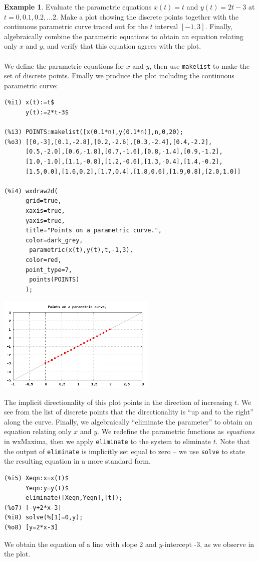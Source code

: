 \documentclass[10.5pt,twoside]{report}
\theoremstyle{definition}
\newtheorem{exmp}{Example}[section]
\begin{document}
\begin{exmp}  Evaluate the parametric equations $x(t)=t$ and $y(t)=2t-3$ at $t=0,0.1,0.2,\dots 2$.  Make a plot showing the discrete points together with the continuous parametric curve traced out for the $t$ interval $[-1,3]$.  Finally, algebraically combine the parametric equations to obtain an equation relating only $x$ and $y$, and verify that this equation agrees with the plot. \\
${}$\\

We define the parametric equations for $x$ and $y$, then use \verb|makelist| to make the set of discrete points.  Finally we produce the plot including the continuous parametric curve:

\begin{verbatim}
(%i1) x(t):=t$
      y(t):=2*t-3$
      
(%i3) POINTS:makelist([x(0.1*n),y(0.1*n)],n,0,20);
(%o3) [[0,-3],[0.1,-2.8],[0.2,-2.6],[0.3,-2.4],[0.4,-2.2],
      [0.5,-2.0],[0.6,-1.8],[0.7,-1.6],[0.8,-1.4],[0.9,-1.2],
      [1.0,-1.0],[1.1,-0.8],[1.2,-0.6],[1.3,-0.4],[1.4,-0.2],
      [1.5,0.0],[1.6,0.2],[1.7,0.4],[1.8,0.6],[1.9,0.8],[2.0,1.0]]
      
(%i4) wxdraw2d(
      grid=true,
      xaxis=true,
      yaxis=true,
      title="Points on a parametric curve.",
      color=dark_grey,
       parametric(x(t),y(t),t,-1,3),
      color=red,
      point_type=7,
       points(POINTS)
      );
\end{verbatim}

\includegraphics[width=3in]{example_5_1_1_1}

The implicit directionality of this plot points in the direction of increasing $t$.  We see from the list of discrete points that the directionality is ``up and to the right'' along the curve.  Finally, we algebraically ``eliminate the parameter'' to obtain an equation relating only $x$ and $y$. We redefine the parametric functions as \textit{equations} in wxMaxima, then we apply \verb|eliminate| to the system to eliminate $t$. Note that the output of \verb|eliminate| is implicitly set equal to zero -- we use \verb|solve| to state the resulting equation in a more standard form.

\begin{verbatim}
(%i5) Xeqn:x=x(t)$
      Yeqn:y=y(t)$
      eliminate([Xeqn,Yeqn],[t]);
(%o7) [-y+2*x-3]
(%i8) solve(%[1]=0,y);
(%o8) [y=2*x-3]
\end{verbatim}

We obtain the equation of a line with slope 2 and $y$-intercept -3, as we observe in the plot.

\end{exmp}
\end{document}
